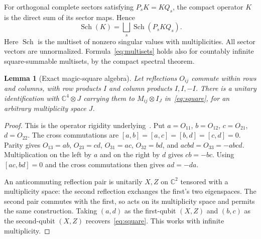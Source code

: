 \documentclass[11pt]{article}
\newtheorem{lemma}[theorem]{Lemma}
\theoremstyle{definition}
\DeclareMathOperator{\Sch}{Sch}
\begin{document}
For orthogonal complete sectors satisfying $P_sK=KQ_s$, the compact operator $K$ is the direct sum of its sector maps. Hence
\begin{equation}\label{eq:multisets}
\Sch(K)=\bigsqcup_s\Sch(P_sKQ_s).
\end{equation}
Here $\Sch$ is the multiset of nonzero singular values with multiplicities. All sector vectors are unnormalized. Formula~\eqref{eq:multisets} holds also for countably infinite square-summable multisets, by the compact spectral theorem.

\begin{lemma}[Exact magic-square algebra]\label{lem:ms}
Let reflections $O_{ij}$ commute within rows and columns, with row products $I$ and column products $I,I,-I$. There is a unitary identification with $\mathbb C^4\otimes J$ carrying them to $M_{ij}\otimes I_J$ in~\eqref{eq:square}, for an arbitrary multiplicity space $J$.
\end{lemma}
\begin{proof}
This is the operator rigidity underlying~\cite[Proposition~2 and Appendix~A.2]{Mancinska}. Put $a=O_{11}$, $b=O_{12}$, $c=O_{21}$, $d=O_{22}$. The cross commutations are $[a,b]=[a,c]=[b,d]=[c,d]=0$. Parity gives $O_{13}=ab$, $O_{23}=cd$, $O_{31}=ac$, $O_{32}=bd$, and $acbd=O_{33}=-abcd$. Multiplication on the left by $a$ and on the right by $d$ gives $cb=-bc$. Using $[ac,bd]=0$ and the cross commutations then gives $ad=-da$.

An anticommuting reflection pair is unitarily $X,Z$ on $\mathbb C^2$ tensored with a multiplicity space: the second reflection exchanges the first's two eigenspaces. The second pair commutes with the first, so acts on its multiplicity space and permits the same construction. Taking $(a,d)$ as the first-qubit $(X,Z)$ and $(b,c)$ as the second-qubit $(X,Z)$ recovers~\eqref{eq:square}. This works with infinite multiplicity.
\end{proof}
\end{document}
